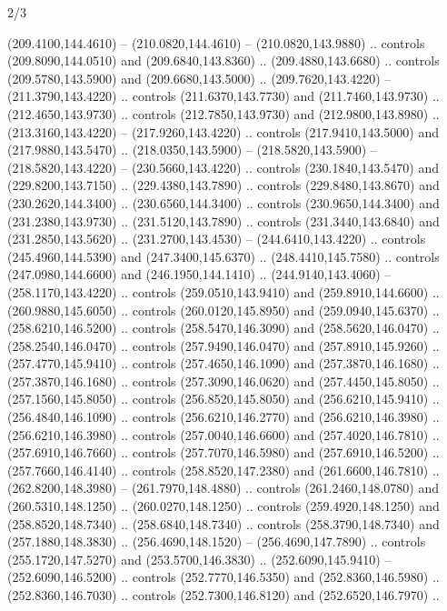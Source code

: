 \begin{flagdescription}{2/3}
\begin{scope}[xshift=0.5\flaglength,yshift=0.5\flagwidth,scale=\flagwidth/259.2]
\begin{scope}[y=0.8pt, x=0.8pt, yscale=-1,shift={(-243,-162)}]
      (209.4100,144.4610) -- (210.0820,144.4610) -- (210.0820,143.9880) .. controls
      (209.8090,144.0510) and (209.6840,143.8360) .. (209.4880,143.6680) .. controls
      (209.5780,143.5900) and (209.6680,143.5000) .. (209.7620,143.4220) --
      (211.3790,143.4220) .. controls (211.6370,143.7730) and (211.7460,143.9730) ..
      (212.4650,143.9730) .. controls (212.7850,143.9730) and (212.9800,143.8980) ..
      (213.3160,143.4220) -- (217.9260,143.4220) .. controls (217.9410,143.5000) and
      (217.9880,143.5470) .. (218.0350,143.5900) -- (218.5820,143.5900) --
      (218.5820,143.4220) -- (230.5660,143.4220) .. controls (230.1840,143.5470) and
      (229.8200,143.7150) .. (229.4380,143.7890) .. controls (229.8480,143.8670) and
      (230.2620,144.3400) .. (230.6560,144.3400) .. controls (230.9650,144.3400) and
      (231.2380,143.9730) .. (231.5120,143.7890) .. controls (231.3440,143.6840) and
      (231.2850,143.5620) .. (231.2700,143.4530) -- (244.6410,143.4220) .. controls
      (245.4960,144.5390) and (247.3400,145.6370) .. (248.4410,145.7580) .. controls
      (247.0980,144.6600) and (246.1950,144.1410) .. (244.9140,143.4060) --
      (258.1170,143.4220) .. controls (259.0510,143.9410) and (259.8910,144.6600) ..
      (260.9880,145.6050) .. controls (260.0120,145.8950) and (259.0940,145.6370) ..
      (258.6210,146.5200) .. controls (258.5470,146.3090) and (258.5620,146.0470) ..
      (258.2540,146.0470) .. controls (257.9490,146.0470) and (257.8910,145.9260) ..
      (257.4770,145.9410) .. controls (257.4650,146.1090) and (257.3870,146.1680) ..
      (257.3870,146.1680) .. controls (257.3090,146.0620) and (257.4450,145.8050) ..
      (257.1560,145.8050) .. controls (256.8520,145.8050) and (256.6210,145.9410) ..
      (256.4840,146.1090) .. controls (256.6210,146.2770) and (256.6210,146.3980) ..
      (256.6210,146.3980) .. controls (257.0040,146.6600) and (257.4020,146.7810) ..
      (257.6910,146.7660) .. controls (257.7070,146.5980) and (257.6910,146.5200) ..
      (257.7660,146.4140) .. controls (258.8520,147.2380) and (261.6600,146.7810) ..
      (262.8200,148.3980) -- (261.7970,148.4880) .. controls (261.2460,148.0780) and
      (260.5310,148.1250) .. (260.0270,148.1250) .. controls (259.4920,148.1250) and
      (258.8520,148.7340) .. (258.6840,148.7340) .. controls (258.3790,148.7340) and
      (257.1880,148.3830) .. (256.4690,148.1520) -- (256.4690,147.7890) .. controls
      (255.1720,147.5270) and (253.5700,146.3830) .. (252.6090,145.9410) --
      (252.6090,146.5200) .. controls (252.7770,146.5350) and (252.8360,146.5980) ..
      (252.8360,146.7030) .. controls (252.7300,146.8120) and (252.6520,146.7970) ..

\end{scope}
\end{scope}
\end{flagdescription}
